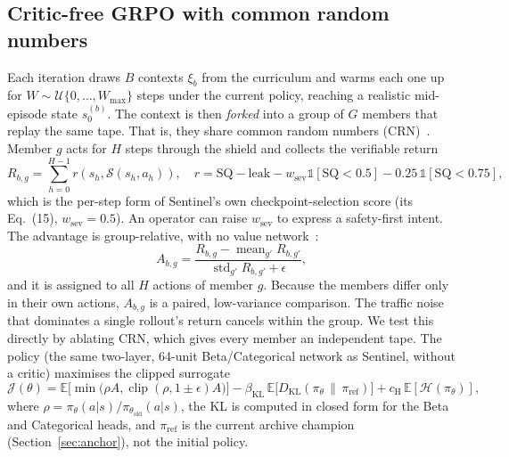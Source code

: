 \subsection{Critic-free GRPO with common random numbers}
\label{sec:grpo}
Each iteration draws $B$ contexts $\xi_b$ from the curriculum and warms each one
up for $W\sim\mathcal{U}\{0,\dots,W_{\max}\}$ steps under the current policy,
reaching a realistic mid-episode state $s^{(b)}_0$. The context is then
\emph{forked} into a group of $G$ members that replay the same tape. That is,
they share common random numbers (CRN)~\cite{ng2000pegasus}. Member $g$ acts
for $H$ steps through the shield and collects the verifiable return
\begin{equation}
R_{b,g}=\sum_{h=0}^{H-1} r(s_h,\mathcal{S}(s_h,a_h)),\quad
r = \mathrm{SQ}-\mathrm{leak}-w_{\text{sev}}\mathbb{1}[\mathrm{SQ}<0.5]-0.25\,\mathbb{1}[\mathrm{SQ}<0.75],
\label{eq:reward}
\end{equation}
which is the per-step form of Sentinel's own checkpoint-selection score (its
Eq.~(15), $w_{\text{sev}}=0.5$). An operator can raise $w_{\text{sev}}$ to
express a safety-first intent. The advantage is group-relative, with no value
network~\cite{shao2024deepseekmath}:
\begin{equation}
A_{b,g}=\frac{R_{b,g}-\operatorname{mean}_{g'}R_{b,g'}}{\operatorname{std}_{g'}R_{b,g'}+\epsilon},
\label{eq:adv}
\end{equation}
and it is assigned to all $H$ actions of member $g$. Because the members differ
only in their own actions, $A_{b,g}$ is a paired, low-variance comparison. The
traffic noise that dominates a single rollout's return cancels within the
group. We test this directly by ablating CRN, which gives every member an
independent tape.
The policy (the same two-layer, 64-unit Beta/Categorical network as Sentinel,
without a critic) maximises the clipped surrogate
\begin{equation}
\mathcal{J}(\theta)=\mathbb{E}\Big[\min\big(\rho A,\operatorname{clip}(\rho,1\!\pm\!\epsilon)A\big)\Big]
-\beta_{\text{KL}}\,\mathbb{E}\big[D_{\mathrm{KL}}(\pi_\theta\,\|\,\pi_{\text{ref}})\big]
+c_{\text{H}}\,\mathbb{E}[\mathcal{H}(\pi_\theta)],
\label{eq:grpo}
\end{equation}
where $\rho=\pi_\theta(a|s)/\pi_{\theta_{\text{old}}}(a|s)$, the KL is computed in
closed form for the Beta and Categorical heads, and $\pi_{\text{ref}}$ is the
current archive champion (Section~\ref{sec:anchor}), not the initial policy.

